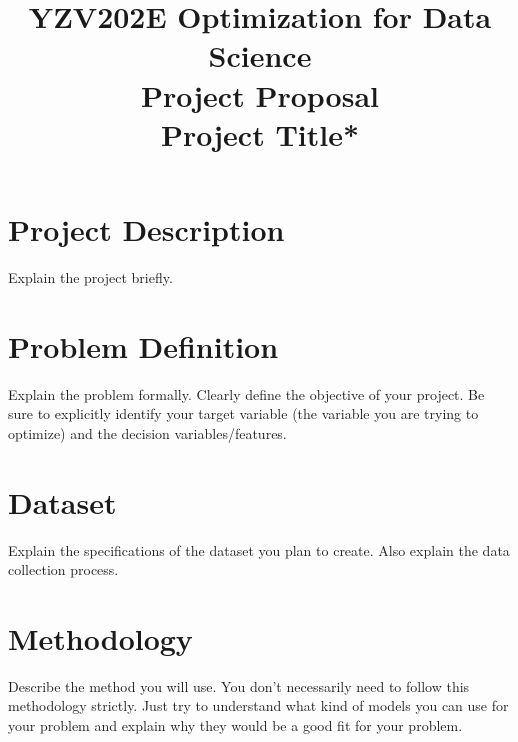 \documentclass[conference]{IEEEtran}
\begin{document}
\title{
YZV202E Optimization for Data Science \\ 
Project Proposal\\
Project Title*
}

\author{
\and
{}
\and
{}
}

\maketitle
\vspace{-1cm}
\section{Project Description}
Explain the project briefly.

\section{Problem Definition}
Explain the problem formally. Clearly define the objective of your project. Be sure to explicitly identify your target variable (the variable you are trying to optimize) and the decision variables/features.

\section{Dataset}
Explain the specifications of the dataset you plan to create. Also explain the data collection process.

\section{Methodology}
Describe the method you will use. You don't necessarily need to follow this methodology strictly. Just try to understand what kind of models you can use for your problem and explain why they would be a good fit for your problem.
\end{document}
